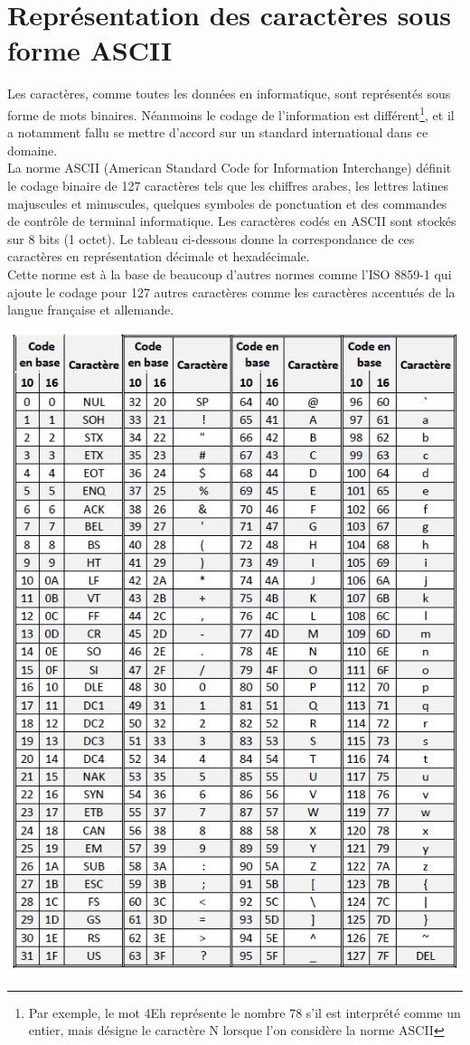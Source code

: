 \section{Représentation des caractères sous forme ASCII}
Les caractères, comme toutes les données en informatique, sont représentés sous forme de mots binaires. Néanmoins le codage de l'information est différent\footnote{Par exemple, le mot 4Eh représente le nombre 78 s’il est interprété comme un entier, mais désigne le caractère N lorsque l’on considère la norme ASCII}, et il a notamment fallu se mettre d'accord sur un standard international dans ce domaine.\\

La norme ASCII (American Standard Code for Information Interchange) définit le codage binaire de 127 caractères tels que les chiffres arabes, les lettres latines majuscules et minuscules, quelques symboles de ponctuation et des commandes de contrôle de terminal informatique. Les caractères codés en ASCII sont stockés sur 8 bits (1 octet). Le tableau ci-dessous donne la correspondance de ces caractères en représentation décimale et hexadécimale.\\

Cette norme est à la base de beaucoup d’autres normes comme l’ISO 8859-1 qui ajoute le codage pour 127 autres caractères comme les caractères accentués de la langue française et allemande.
\begin{center}
\includegraphics[scale=1]{Labo3_ASCII.png}
\end{center}

